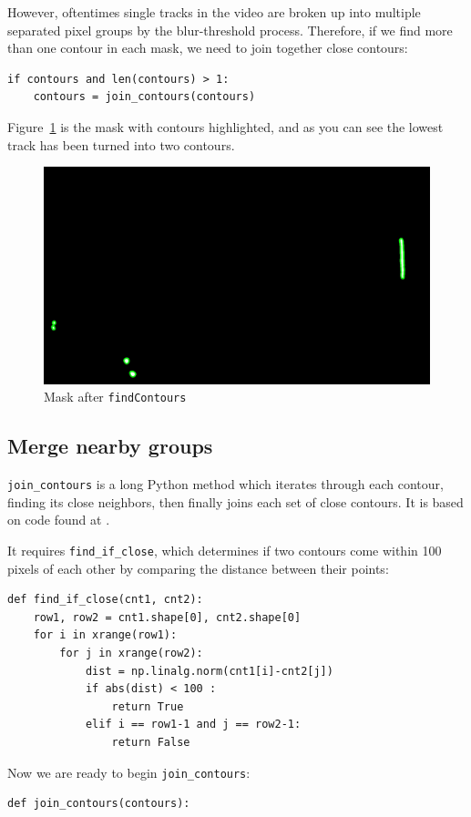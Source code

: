 \documentclass[notitlepage]{article}
\begin{document}
However, oftentimes single tracks in the video are broken up into multiple separated pixel groups by the blur-threshold process.  Therefore, if we find more than one contour in each mask, we need to join together close contours:
\begin{lstlisting}
if contours and len(contours) > 1:
	contours = join_contours(contours)
\end{lstlisting}

Figure~\ref{fig:mask3} is the mask with contours highlighted, and as you can see the lowest track has been turned into two contours.

\begin{figure}[h]
	\centering
	\includegraphics[width=.45\textwidth]{mask3}
	\caption{Mask after \texttt{findContours}\label{fig:mask3}}
\end{figure}

\subsection{Merge nearby groups}

\texttt{join\_contours} is a long Python method which iterates through each contour, finding its close neighbors, then finally joins each set of close contours.  It is based on code found at \cite{join}.


It requires \texttt{find\_if\_close}, which determines if two contours come within 100 pixels of each other by comparing the distance between their points:
\begin{lstlisting}
def find_if_close(cnt1, cnt2):
    row1, row2 = cnt1.shape[0], cnt2.shape[0]
    for i in xrange(row1):
        for j in xrange(row2):
            dist = np.linalg.norm(cnt1[i]-cnt2[j])
            if abs(dist) < 100 :
                return True
            elif i == row1-1 and j == row2-1:
                return False
\end{lstlisting}

Now we are ready to begin \texttt{join\_contours}:
\begin{lstlisting}
def join_contours(contours):
\end{lstlisting}
\end{document}
